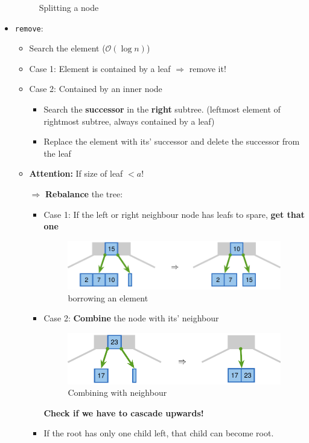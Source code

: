 \documentclass[12pt, a4paper]{scrartcl}
\newcommand{\bigO}{\mathcal{O}}
\renewcommand{\implies}{\Rightarrow}
\newcommand{\imgwidth}{.7\textwidth}
\begin{document}
\begin{itemize}
\begin{figure}[htbp]
    \caption{Splitting a node}
    \label{fig:split_node}
  \end{figure}
\item \texttt{remove}:
  \begin{itemize}
  \item Search the element ($\bigO(\log n)$)
  \item Case 1: Element is contained by a leaf $\implies$ remove it!
  \item Case 2: Contained by an inner node
    \begin{itemize}
    \item Search the \textbf{successor} in the \textbf{right} subtree. (leftmost element of rightmost subtree, always contained by a leaf)
    \item Replace the element with its' successor and delete the successor from the leaf
    \end{itemize}
    \item \textbf{Attention:} If size of leaf $< a$!
    \item[$\implies$] \textbf{Rebalance} the tree:
      \begin{itemize}
      \item Case 1: If the left or right neighbour node has leafs to spare, \textbf{get that one}
        \begin{figure}[htbp]
          \centering
          \includegraphics[width=\imgwidth]{borrowing_element}
          \caption{borrowing an element}
          \label{fig:borrowing_element}
        \end{figure}
      \item Case 2: \textbf{Combine} the node with its' neighbour\\
        \begin{figure}[htbp]
          \centering
          \includegraphics[width=\imgwidth]{combine_neighbour}
          \caption{Combining with neighbour}
          \label{fig:combine_neighbour}
        \end{figure}
        \textbf{Check if we have to cascade upwards!}
      \item If the root has only one child left, that child can become root.
      \end{itemize}
    \end{itemize}
  \end{itemize}
  
\end{document}
